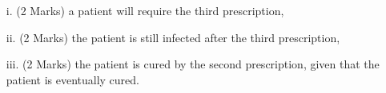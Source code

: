 \documentclass[]{article}
\begin{document}
\begin{itemize}
\begin{itemize}
\item[i.](2 Marks) a patient will require the third prescription,
\item[ii.](2 Marks) the patient is still infected after the third prescription,
\item[iii.](2 Marks) the patient is cured by the second prescription, given that the patient is eventually cured.
\end{itemize}

\end{itemize}
\end{document}
